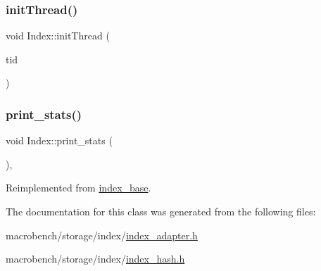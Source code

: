 \mbox{\label{classIndex_a6a509df225912ffea8547fa0daa57d8c}} 
\subsubsection{\texorpdfstring{init\+Thread()}{initThread()}\hspace{0.1cm}{\footnotesize\ttfamily [2/2]}}
{\footnotesize\ttfamily void Index\+::init\+Thread (\begin{DoxyParamCaption}\item[{const int}]{tid }\end{DoxyParamCaption})\hspace{0.3cm}{\ttfamily [inline]}}

\mbox{\label{classIndex_ab300e132e8a12e3334003227a2e3f618}} 
\subsubsection{\texorpdfstring{print\+\_\+stats()}{print\_stats()}}
{\footnotesize\ttfamily void Index\+::print\+\_\+stats (\begin{DoxyParamCaption}{ }\end{DoxyParamCaption})\hspace{0.3cm}{\ttfamily [inline]}, {\ttfamily [virtual]}}



Reimplemented from \hyperlink{classindex__base_a2515fc45e7ca43a9914c0410a9b663c8}{index\+\_\+base}.



The documentation for this class was generated from the following files\+:\begin{DoxyCompactItemize}
\item 
macrobench/storage/index/\hyperlink{index__adapter_8h}{index\+\_\+adapter.\+h}\item 
macrobench/storage/index/\hyperlink{index__hash_8h}{index\+\_\+hash.\+h}\end{DoxyCompactItemize}
